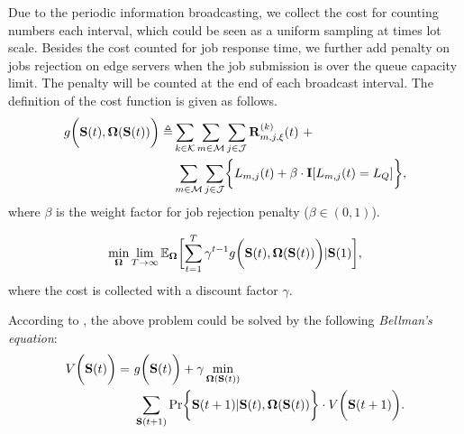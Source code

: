 Due to the periodic information broadcasting, we collect the cost for counting numbers each interval, which could be seen as a uniform sampling at times lot scale.
Besides the cost counted for job response time, we further add penalty on jobs rejection on edge servers when the job submission is over the queue capacity limit. The penalty will be counted at the end of each broadcast interval.
The definition of the cost function is given as follows.
\begin{align}
    g\Paren{\Stat({t}), \Policy(\Stat({t}))} \define
        &\sum_{k\in\apSet} \sum_{m\in\esSet} \sum_{j\in\jSpace} \vec{R}^{(k)}_{m,j,\xi}({t})~+
        \nonumber\\
        &\sum_{m\in\esSet} \sum_{j\in\jSpace} \Brace{L_{m,j}({t}) + \beta \cdot \mat{I}[L_{m,j}({t})=L_Q]},
\end{align}
where $\beta$ is the weight factor for job rejection penalty ($\beta \in (0,1)$).

\begin{problem}
    \begin{align}
        \min_{\Policy} \lim_{T \to \infty}
            \mathbb{E}_{\Policy}
                \Bracket{\sum_{t=1}^{T} \gamma^{t-1} g\Paren{\Stat({t}), \Policy(\Stat({t}))}|\Stat(1)},
    \end{align}
    where the cost is collected with a discount factor $\gamma$.
\end{problem}
According to \cite{sutton1998introduction}, the above problem could be solved by the following \emph{Bellman's equation}:
\begin{align}
    V\Paren{\Stat({t})} =~&g\Paren{\Stat({t})} + \gamma \min_{\Policy(\Stat({t}))}
        \nonumber\\
        &\sum_{\Stat({t+1})} \Pr\Brace{ \Stat({t+1})|\Stat({t}), \Policy(\Stat({t})) } \cdot V\Paren{\Stat({t+1})}.
    \label{sp_0}
\end{align}

